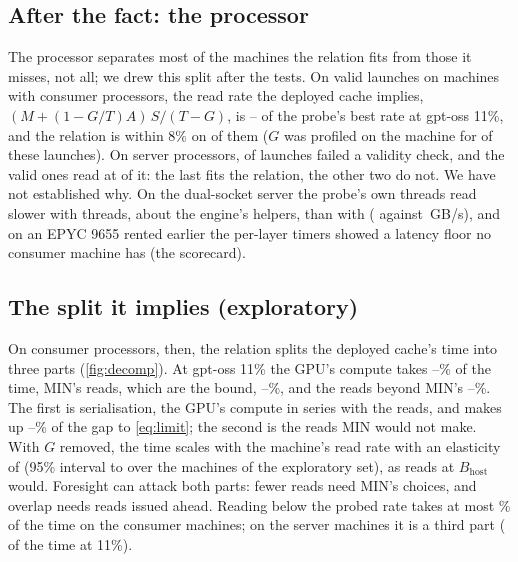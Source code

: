 \subsection{After the fact: the processor}
The processor separates most of the machines the relation fits from those it misses, not all; we drew this split
after the tests. On \jmConsN{} valid launches on \jmConsMachines{} machines with consumer processors, the read rate the deployed
cache implies, $(M + (1-G/T)A)\,S/(T-G)$, is \jmConsEffMin--\jmConsEffMax{} of the probe's best rate at gpt-oss 11\%,
and the relation is within 8\% on \jmConsWithinEight{} of them ($G$ was profiled on the machine for \rbConsProf{} of
these launches). On server processors, \jmServInvalid{} of \jmServAll{}
launches failed a validity check, and the \jmServWord{} valid ones read at \jmServList{} of it: the last fits the
relation, the other two do not. We have not established why. On the dual-socket server the probe's own threads read slower with \jlServCpuManyThreads{} threads, about the
engine's \jlServHelpers{} helpers, than with \jlServCpuBestThreads{} (\jlServCpuMany{} against \jlServCpuBest\,GB/s), and
on an EPYC 9655 rented earlier the per-layer timers showed a latency floor no consumer machine has (the scorecard).

\subsection{The split it implies (exploratory)}
On consumer processors, then, the relation splits the deployed cache's time into three parts (\cref{fig:decomp}). At gpt-oss 11\%
the GPU's compute takes \dcShareGLowMin--\dcShareGLowMax\% of the time, MIN's reads, which are the bound,
\dcShareMinLowMin--\dcShareMinLowMax\%, and the reads beyond MIN's \dcShareExLowMin--\dcShareExLowMax\%. The first is
serialisation, the GPU's compute in series with the reads, and makes up \dcGapGLowMin--\dcGapGLowMax\% of the gap to
\cref{eq:limit}; the second is the reads MIN would not make. With $G$ removed, the time scales with the machine's read rate
with an elasticity of \slElastLow{} (95\% interval \slElastLowLo{} to \slElastLowHi{} over the machines of the
exploratory set), as reads at
$B_{\mathrm{host}}$ would. Foresight can attack both parts: fewer reads need MIN's choices, and overlap needs reads
issued ahead. Reading below the probed rate takes at most \dcDeskShortLowMax\% of the time on the consumer machines;
on the server machines it is a third part (\dcServShortLow{} of the time at 11\%).

